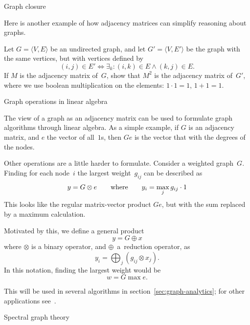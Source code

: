  {Graph closure}

Here is another example of how adjacency matrices can simplify
reasoning about graphs.
\begin{exercise}
  Let $G=\langle V,E\rangle$ be an undirected graph, and let $G'=\langle
  V,E'\rangle$ be the graph with the same vertices, but with vertices
  defined by
  \[ (i,j)\in E'\Leftrightarrow \exists_k\colon (i,k)\in E\wedge
  (k,j)\in E. \]
  If $M$ is the adjacency matrix of~$G$, show that $M^2$ is the
  adjacency matrix of~$G'$, where we use boolean multiplication on the
  elements: $1\cdot1=1$, $1+1=1$.
\end{exercise}

 {Graph operations in linear algebra}

The view of a graph as an adjacency matrix can be used to formulate
graph algorithms through linear algebra. As a simple example, if $G$ 
is an adjacency matrix, and $e$ the vector of all~$1$s, then $Ge$ is 
the vector that with the degrees of the nodes.

Other operations are a little harder to formulate. Consider a weighted graph~$G$.
Finding for each node~$i$ the largest weight~$g_{ij}$ can be described as
\[ y=G\otimes e\qquad\hbox{where}\qquad
   y_i=\max_j g_{ij}\cdot 1
\]
This looks like the regular matrix-vector product $Ge$, but with
the sum replaced by a maximum calculation.

Motivated by this, we define a general product
\[ y = G \mathop{\oplus\cdot_\otimes} x \]
where $\otimes$ is a binary operator, and $\oplus$~a~reduction operator,
as
\[ y_i = \bigoplus_j (g_{ij} \otimes x_j ). \]
In this notation, finding the largest weight would be
\[ w= G\mathop{\max\cdot_\times} e. \]

This will be used in several algorithms in section~\ref{sec:graph-analytics};
for other applications see~\cite{Kung:pegasus2009}.

 {Spectral graph theory}
\label{app:fiedler}

